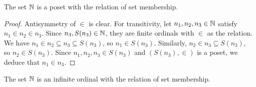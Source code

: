 \begin{lemma} \label{naturals-form-a-poset}
    The set $\operatorname{\mathbb N}$ is a poset with the relation of set membership.
\end{lemma}

\begin{proof}
    Antisymmetry of $\in$ is clear. For transitivity, let $n_1, n_2, n_3 \in \operatorname{\mathbb N}$ satisfy $n_1 \in n_2 \in n_3$. Since $n_3, S(n_3) \in \operatorname{\mathbb N}$, they are finite ordinals with $\in$ as the relation. We have $n_1 \in n_2 \subseteq n_3 \subseteq S(n_3)$, so $n_1 \in S(n_3)$. Similarly, $n_2 \in n_3 \subseteq S(n_3)$, so $n_2 \in S(n_3)$. Since $n_1, n_2, n_3 \in S(n_3)$ and $(S(n_3), \in)$ is a poset, we deduce that $n_1 \in n_3$. 
\end{proof}

\begin{theorem} \label{well-ordering-of-the-naturals}
    The set $\operatorname{\mathbb N}$ is an infinite ordinal with the relation of set membership.
\end{theorem}

